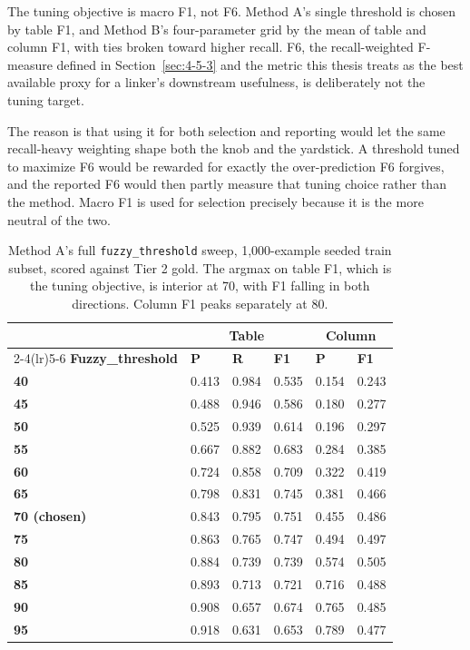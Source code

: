The tuning objective is macro F1, not F6. Method A's single threshold is chosen by table F1, and Method B's four-parameter grid by the mean of table and column F1, with ties broken toward higher recall. F6, the recall-weighted F-measure defined in Section~\ref{sec:4-5-3} and the metric this thesis treats as the best available proxy for a linker's downstream usefulness, is deliberately not the tuning target.

The reason is that using it for both selection and reporting would let the same recall-heavy weighting shape both the knob and the yardstick. A threshold tuned to maximize F6 would be rewarded for exactly the over-prediction F6 forgives, and the reported F6 would then partly measure that tuning choice rather than the method. Macro F1 is used for selection precisely because it is the more neutral of the two.

\begin{table}[htbp]
\centering
\caption{Method A's full \texttt{fuzzy\_threshold} sweep, 1,000-example seeded train subset, scored against Tier 2 gold. The argmax on table F1, which is the tuning objective, is interior at 70, with F1 falling in both directions. Column F1 peaks separately at 80.}\label{tab:4-3}
\small\setlength{\tabcolsep}{4pt}
\begin{tabular}{@{}llllll@{}}
\toprule
 & \multicolumn{3}{c}{\small\textbf{Table}} & \multicolumn{2}{c}{\small\textbf{Column}}\tabularnewline
\cmidrule(lr){2-4}\cmidrule(lr){5-6}
\textbf{Fuzzy\_threshold} & \textbf{P} & \textbf{R} & \textbf{F1} & \textbf{P} & \textbf{F1}\tabularnewline
\midrule
\textbf{40} & 0.413 & 0.984 & 0.535 & 0.154 & 0.243\tabularnewline
\textbf{45} & 0.488 & 0.946 & 0.586 & 0.180 & 0.277\tabularnewline
\textbf{50} & 0.525 & 0.939 & 0.614 & 0.196 & 0.297\tabularnewline
\textbf{55} & 0.667 & 0.882 & 0.683 & 0.284 & 0.385\tabularnewline
\textbf{60} & 0.724 & 0.858 & 0.709 & 0.322 & 0.419\tabularnewline
\textbf{65} & 0.798 & 0.831 & 0.745 & 0.381 & 0.466\tabularnewline
\textbf{70 (chosen)} & 0.843 & 0.795 & 0.751 & 0.455 & 0.486\tabularnewline
\textbf{75} & 0.863 & 0.765 & 0.747 & 0.494 & 0.497\tabularnewline
\textbf{80} & 0.884 & 0.739 & 0.739 & 0.574 & 0.505\tabularnewline
\textbf{85} & 0.893 & 0.713 & 0.721 & 0.716 & 0.488\tabularnewline
\textbf{90} & 0.908 & 0.657 & 0.674 & 0.765 & 0.485\tabularnewline
\textbf{95} & 0.918 & 0.631 & 0.653 & 0.789 & 0.477\tabularnewline
\bottomrule
\end{tabular}
\end{table}







